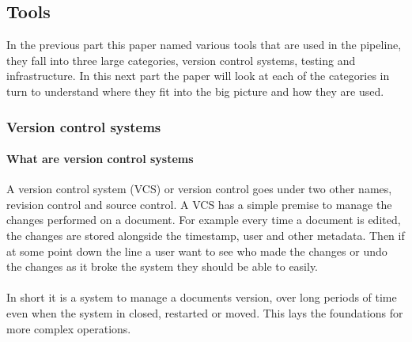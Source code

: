 \subsection{Tools}

In the previous part this paper named various tools that are used in the pipeline, they fall into three large categories, version control systems, testing  and infrastructure. In this next part the paper will look at each of the categories in turn to understand where they fit into the big picture and how they are used.

\subsubsection{Version control systems}

\paragraph{What are version control systems}
A version control system (VCS) or version control goes under two other names, revision control and source control. A VCS has a simple premise to manage the changes performed on a document. For example every time a document is edited, the changes are stored alongside the timestamp, user and other metadata. Then if at some point down the line a user want to see who made the changes or undo the changes as it broke the system they should be able to easily. 
\\\\
In short it is a system to manage a documents version, over long periods of time even when the system in closed, restarted or moved. This lays the foundations for more complex operations. 

